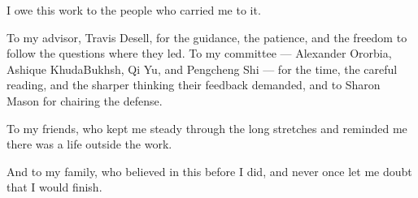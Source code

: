 \begin{acknowledgements}
I owe this work to the people who carried me to it.

To my advisor, Travis Desell, for the guidance, the patience, and the freedom to
follow the questions where they led. To my committee --- Alexander Ororbia,
Ashique KhudaBukhsh, Qi Yu, and Pengcheng Shi --- for the time, the careful
reading, and the sharper thinking their feedback demanded, and to Sharon Mason
for chairing the defense.

To my friends, who kept me steady through the long stretches and reminded me
there was a life outside the work.

And to my family, who believed in this before I did, and never once let me
doubt that I would finish.
\end{acknowledgements}
